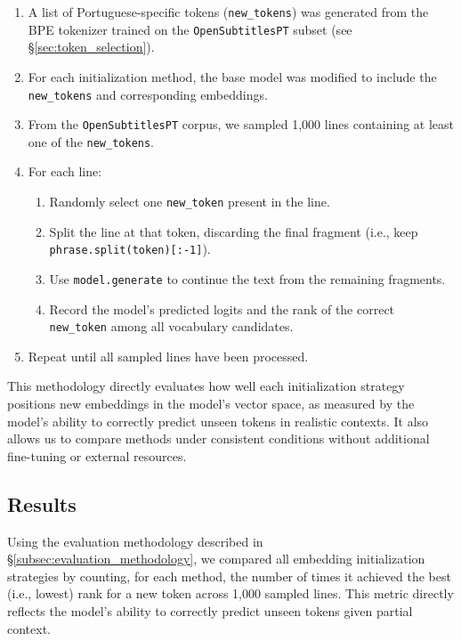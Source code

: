\begin{enumerate}
    \item A list of Portuguese-specific tokens (\texttt{new\_tokens}) was generated from the BPE tokenizer trained on the \texttt{OpenSubtitlesPT} subset (see \S\ref{sec:token_selection}).
    \item For each initialization method, the base model was modified to include the \texttt{new\_tokens} and corresponding embeddings.
    \item From the \texttt{OpenSubtitlesPT} corpus, we sampled 1,000 lines containing at least one of the \texttt{new\_tokens}.
    \item For each line:
        \begin{enumerate}
            \item Randomly select one \texttt{new\_token} present in the line.
            \item Split the line at that token, discarding the final fragment (i.e., keep \texttt{phrase.split(token)[:-1]}).
            \item Use \texttt{model.generate} to continue the text from the remaining fragments.
            \item Record the model's predicted logits and the rank of the correct \texttt{new\_token} among all vocabulary candidates.
        \end{enumerate}
    \item Repeat until all sampled lines have been processed.
\end{enumerate}

This methodology directly evaluates how well each initialization strategy positions new embeddings in the model's vector space, as measured by the model’s ability to correctly predict unseen tokens in realistic contexts. It also allows us to compare methods under consistent conditions without additional fine-tuning or external resources.



\subsection{Results}
\label{subsec:results}

Using the evaluation methodology described in \S\ref{subsec:evaluation_methodology}, we compared all embedding initialization strategies by counting, for each method, the number of times it achieved the best (i.e., lowest) rank for a new token across 1,000 sampled lines. This metric directly reflects the model’s ability to correctly predict unseen tokens given partial context.

